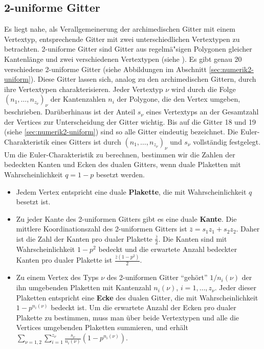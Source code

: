 \subsection{2-uniforme Gitter}
\label{sec:2-uniform}
Es liegt nahe, als Verallgemeinerung der archimedischen Gitter mit einem Vertextyp, entsprechende Gitter mit zwei unterschiedlichen Vertextypen zu betrachten. 2-uniforme Gitter sind Gitter aus regelm\"a"sigen Polygonen gleicher Kantenl\"ange und zwei verschiedenen Vertextypen (siehe \cite{Gruenbaum:86}). Es gibt genau 20 verschiedene 2-uniforme Gitter (siehe Abbildungen im Abschnitt \ref{sec:numerik2-uniform}). Diese Gitter lassen sich, analog zu den archimedischen Gittern, durch ihre Vertextypen charakterisieren. Jeder Vertextyp $\nu$ wird durch die Folge $(n_1,\ldots,n_{z_\nu})_{\nu}$ der Kantenzahlen $n_i$ der Polygone, die den Vertex umgeben, beschrieben. Dar\"uberhinaus ist der Anteil $s_\nu$ eines Vertextyps an der Gesamtzahl der Vertices zur Unterscheidung der Gitter wichtig. Bis auf die Gitter 18 und 19 (siehe \ref{sec:numerik2-uniform}) sind so alle Gitter eindeutig bezeichnet. Die Euler-Charakteristik eines Gitters ist durch $(n_1,\ldots,n_{z_\nu})_{\nu}$ und $s_\nu$ vollst\"andig festgelegt.\\
Um die Euler-Charakteristik zu berechnen, bestimmen wir die Zahlen der bedeckten Kanten und Ecken des dualen Gitters, wenn duale Plaketten mit Wahrscheinlichkeit $q=1-p$ besetzt werden. 
\begin{itemize}
\item Jedem Vertex entspricht eine duale \textbf{Plakette}, die mit Wahrscheinlichkeit $q$ besetzt ist. 
\item Zu jeder Kante des 2-uniformen Gitters gibt es eine duale \textbf{Kante}. Die mittlere Koordinationszahl des 2-uniformen Gitters ist $\bar{z}=s_1z_1+s_2z_2$. Daher ist die Zahl der Kanten pro dualer Plakette $\frac{\bar{z}}{2}$.  Die Kanten sind mit Wahrscheinlichkeit $1-p^2$ bedeckt und die erwartete Anzahl bedeckter Kanten pro dualer Plakette ist $\frac{\bar{z}(1-p^2)}{2}$.
\item Zu einem Vertex des Typs $\nu$ des 2-uniformen Gitter ``geh\"ort'' $1/n_{i}(\nu)$ der ihn umgebenden Plaketten mit Kantenzahl $n_{i}(\nu)$, $i=1,\ldots,z_\nu$. Jeder dieser Plaketten entspricht eine \textbf{Ecke} des dualen Gitter, die mit Wahrscheinlichkeit $1-p^{n_{i}(\nu)}$ bedeckt ist. Um die erwartete Anzahl der Ecken pro dualer Plakette zu bestimmen, muss man \"uber beide Vertextypen und alle die Vertices umgebenden Plaketten summieren, und erh\"alt $\sum_{\nu=1,2}\sum_{i=1}^{z_\nu}\frac{s_\nu}{n_{i}(\nu)}(1-p^{n_{i}(\nu)})$.  
\end{itemize}
